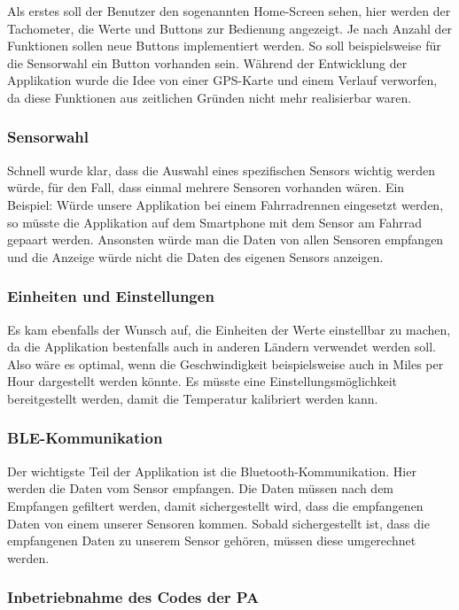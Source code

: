 Als erstes soll der Benutzer den sogenannten Home-Screen sehen, hier werden der Tachometer, die Werte und Buttons zur Bedienung angezeigt. Je nach Anzahl der Funktionen sollen neue Buttons implementiert werden. So soll beispielsweise für die Sensorwahl ein Button vorhanden sein. Während der Entwicklung der Applikation wurde die Idee von einer GPS-Karte und einem Verlauf verworfen, da diese Funktionen aus zeitlichen Gründen nicht mehr realisierbar waren.

\subsubsection{Sensorwahl}

Schnell wurde klar, dass die Auswahl eines spezifischen Sensors wichtig werden würde, für den Fall, dass einmal mehrere Sensoren vorhanden wären. Ein Beispiel: Würde unsere Applikation bei einem Fahrradrennen eingesetzt werden, so müsste die Applikation auf dem Smartphone mit dem Sensor am Fahrrad gepaart werden. Ansonsten würde man die Daten von allen Sensoren empfangen und die Anzeige würde nicht die Daten des eigenen Sensors anzeigen.

\subsubsection{Einheiten und Einstellungen}

Es kam ebenfalls der Wunsch auf, die Einheiten der Werte einstellbar zu machen, da die Applikation bestenfalls auch in anderen Ländern verwendet werden soll. Also wäre es optimal, wenn die Geschwindigkeit beispielsweise auch in Miles per Hour dargestellt werden könnte. Es müsste eine Einstellungsmöglichkeit bereitgestellt werden, damit die Temperatur kalibriert werden kann.

\subsubsection{BLE-Kommunikation}

Der wichtigste Teil der Applikation ist die Bluetooth-Kommunikation. Hier werden die Daten vom Sensor empfangen. Die Daten müssen nach dem Empfangen gefiltert werden, damit sichergestellt wird, dass die empfangenen Daten von einem unserer Sensoren kommen. Sobald sichergestellt ist, dass die empfangenen Daten zu unserem Sensor gehören, müssen diese umgerechnet werden.

\subsubsection{Inbetriebnahme des Codes der PA}

